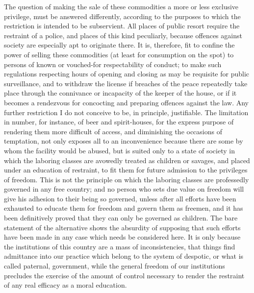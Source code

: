 \documentclass[12pt]{report}
\begin{document}
The question of making the sale of these commodities a more or less exclusive privilege, must be answered differently, according to the purposes to which the restriction is intended to be subservient. All places of public resort require the restraint of a police, and places of this kind peculiarly, because offences against society are especially apt to originate there. It is, therefore, fit to confine the power of selling these commodities (at least for consumption on the spot) to persons of known or vouched-for respectability of conduct; to make such regulations respecting hours of opening and closing as may be requisite for public surveillance, and to withdraw the license if breaches of the peace repeatedly take place through the connivance or incapacity of the keeper of the house, or if it becomes a rendezvous for concocting and preparing offences against the law. Any further restriction I do not conceive to be, in principle, justifiable. The limitation in number, for instance, of beer and spirit-houses, for the express purpose of rendering them more difficult of access, and diminishing the occasions of temptation, not only exposes all to an inconvenience because there are some by whom the facility would be abused, but is suited only to a state of society in which the laboring classes are avowedly treated as children or savages, and placed under an education of restraint, to fit them for future admission to the privileges of freedom. This is not the principle on which the laboring classes are professedly governed in any free country; and no person who sets due value on freedom will give his adhesion to their being so governed, unless after all efforts have been exhausted to educate them for freedom and govern them as freemen, and it has been definitively proved that they can only be governed as children. The bare statement of the alternative shows the absurdity of supposing that such efforts have been made in any case which needs be considered here. It is only because the institutions of this country are a mass of inconsistencies, that things find admittance into our practice which belong to the system of despotic, or what is called paternal, government, while the general freedom of our institutions precludes the exercise of the amount of control necessary to render the restraint of any real efficacy as a moral education.
\end{document}
